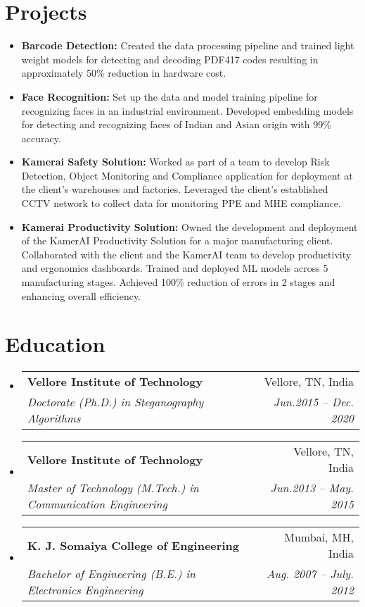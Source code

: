 \documentclass[a4paper,11pt]{article}
\makeatletter
\newcommand{\resumeSubheading}[4]{
  \vspace{-1pt}\item
    \begin{tabular*}{0.97\textwidth}[t]{l@{\extracolsep{\fill}}r}
      \textbf{#1} & #2 \\
      \textit{\small#3} & \textit{\small #4} \\
    \end{tabular*}\vspace{-5pt}
}
\newcommand{\resumeSubHeadingListStart}{\begin{itemize}[leftmargin=*]}
\newcommand{\resumeSubHeadingListEnd}{\end{itemize}}
\makeatother
\begin{document}
\section{Projects}
  \begin{itemize}[leftmargin=*, itemsep = -2pt]
    \item {\textbf{Barcode Detection:} Created the data processing pipeline and trained light weight models for detecting and decoding PDF417 codes resulting in approximately 50\% reduction in hardware cost.}
    \item {\textbf{Face Recognition:} Set up the data and model training pipeline for recognizing faces in an industrial environment. Developed embedding models for detecting and recognizing faces of Indian and Asian origin with 99\% accuracy.}
    \item {\textbf{Kamerai Safety Solution:} Worked as part of a team to develop Risk Detection, Object Monitoring and Compliance application for deployment at the client's warehouses and factories. Leveraged the client's established CCTV network to collect data for monitoring PPE and MHE compliance.}
    \item {\textbf{Kamerai Productivity Solution:} Owned the development and deployment of the KamerAI Productivity Solution for a major manufacturing client. Collaborated with the client and the KamerAI team to develop productivity and ergonomics dashboards. Trained and deployed ML models across 5 manufacturing stages. Achieved 100\% reduction of errors in 2 stages and enhancing overall efficiency.}
  \end{itemize}

\section{Education}
  \resumeSubHeadingListStart
    \resumeSubheading
      {Vellore Institute of Technology}{Vellore, TN, India}
      {Doctorate (Ph.D.) in Steganography Algorithms}{Jun.2015 -- Dec. 2020}
    \resumeSubheading
      {Vellore Institute of Technology}{Vellore, TN, India}
      {Master of Technology (M.Tech.) in Communication Engineering}{Jun.2013 -- May. 2015}
    \resumeSubheading
      {K. J. Somaiya College of Engineering}{Mumbai, MH, India}
      {Bachelor of Engineering (B.E.) in Electronics Engineering}{Aug. 2007 -- July. 2012}
  \resumeSubHeadingListEnd

\end{document}
